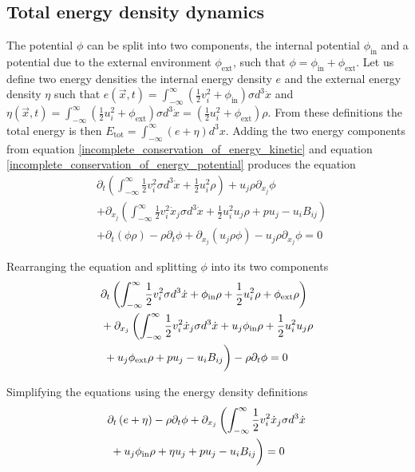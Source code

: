 \documentclass[%
 reprint,
 amsmath,amssymb,
 aps,
]{revtex4-1}
\newcommand{\intV}[1]{\int_{-\infty}^{\infty} #1 d^3x}
\newcommand{\intVdot}[1]{\int_{-\infty}^{\infty} #1 d^3\dot{x}}
\begin{document}
\subsection{Total energy density dynamics}
The potential $\phi$ can be split into two components, the internal potential $\phi_{\text{in}}$ and a potential due to the external environment $\phi_{\text{ext}}$, such that $\phi = \phi_{\text{in}} + \phi_{\text{ext}}$. Let us define two energy densities the internal energy density $e$ and the external energy density $\eta$ such that $e(\vec{x}, t)=\intVdot{\left(\frac{1}{2}v_i^2 + \phi_{\text{in}}\right)\sigma}$ and $\eta(\vec{x}, t)=\intVdot{\left(\frac{1}{2}u_i^2 + \phi_{\text{ext}}\right)\sigma}=\left(\frac{1}{2}u_i^2 + \phi_{\text{ext}}\right)\rho$. From these definitions the total energy is then $E_{\text{tot}}=\intV{\left(e + \eta\right)}$. Adding the two energy components from equation \eqref{incomplete_conservation_of_energy_kinetic} and equation \eqref{incomplete_conservation_of_energy_potential} produces the equation
\[
\begin{split}
& \partial_t\left(\intVdot{\frac{1}{2}v_i^2\sigma} + \frac{1}{2}u_i^2\rho\right) + u_j\rho\partial_{x_j}\phi \\ & + \partial_{x_j}\left(\intVdot{\frac{1}{2}v_i^2\dot{x}_j\sigma} + \frac{1}{2}u_i^2 u_j\rho + p u_j - u_i B_{ij}\right) \\ & + \partial_t\left(\phi\rho\right) - \rho\partial_t\phi + \partial_{x_j}\left(u_j\rho\phi\right) - u_j\rho\partial_{x_j}\phi=0
\end{split}
\]

Rearranging the equation and splitting $\phi$ into its two components
\[
\begin{split}
& \partial_t\left(\intVdot{\frac{1}{2}v_i^2\sigma} + \phi_{\text{in}}\rho + \frac{1}{2}u_i^2\rho + \phi_{\text{ext}}\rho\right) \\ & + \partial_{x_j}\left(\intVdot{\frac{1}{2}v_i^2\dot{x}_j\sigma} + u_j\phi_{\text{in}}\rho + \frac{1}{2}u_i^2 u_j\rho \right. \\ & \left. \vphantom{\intVdot{.}} + u_j\phi_{\text{ext}}\rho + p u_j - u_i B_{ij}\right) - \rho\partial_t\phi=0
\end{split}
\]

Simplifying the equations using the energy density definitions
\[
\begin{split}
& \partial_t\left(e + \eta\right)  - \rho\partial_t\phi + \partial_{x_j}\left(\intVdot{\frac{1}{2}v_i^2\dot{x}_j\sigma} \right. \\ & \left. \vphantom{\intVdot{.}} + u_j\phi_{\text{in}}\rho + \eta u_j + p u_j - u_i B_{ij}\right)=0
\end{split}
\]
\end{document}
